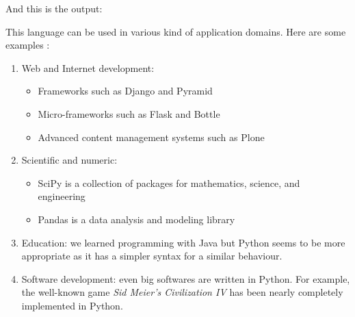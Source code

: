 And this is the output:


This language can be used in various kind of application domains. Here are some examples \cite{python_applications}:
\begin{enumerate}
    \item {Web and Internet development:
        \begin{itemize}
            \item Frameworks such as Django and Pyramid
            \item Micro-frameworks such as Flask and Bottle
            \item Advanced content management systems such as Plone
        \end{itemize}
    }
    \item {Scientific and numeric:
        \begin{itemize}
            \item SciPy is a collection of packages for mathematics, science, and engineering
            \item Pandas is a data analysis and modeling library
        \end{itemize}
    
    }
    \item Education: we learned programming with Java but Python seems to be more appropriate as it has a simpler syntax for a similar behaviour.
    \item Software development: even big softwares are written in Python. For example, the well-known game \emph{Sid Meier's Civilization IV} has been nearly completely implemented in Python.
\end{enumerate}
